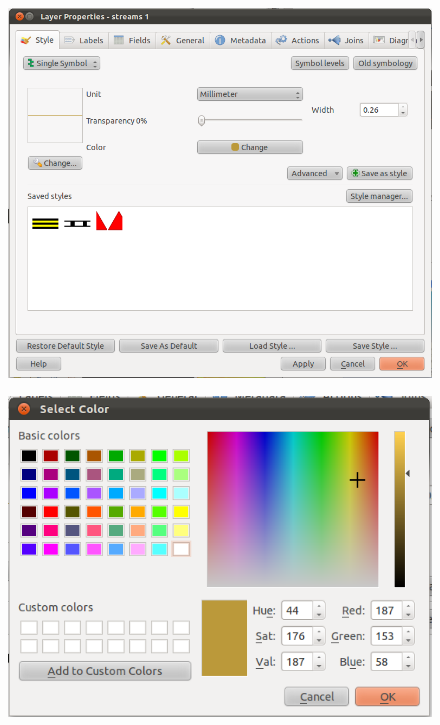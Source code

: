 \begin{figure}[htbp]
   \centering
   \includegraphics[scale=0.3]{qgis022.png}
   \caption{}
   \label{fig:qgis022}
\end{figure}

\begin{figure}[htbp]
   \centering
   \includegraphics[scale=0.35]{qgis023.png}
   \caption{}
   \label{fig:qgis023}
\end{figure}

